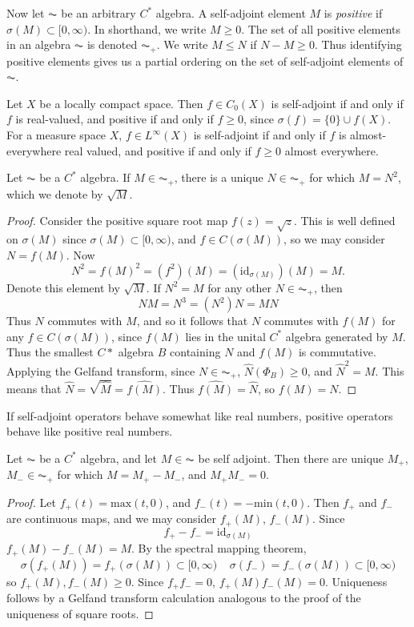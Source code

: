 Now let $\AC$ be an arbitrary $C^*$ algebra. A self-adjoint element $M$ is \emph{positive} if $\sigma(M) \subset [0, \infty)$. In shorthand, we write $M \geq 0$. The set of all positive elements in an algebra $\AC$ is denoted $\AC_+$. We write $M \leq N$ if $N - M \geq 0$. Thus identifying positive elements gives us a partial ordering on the set of self-adjoint elements of $\AC$.

\begin{example}
    Let $X$ be a locally compact space. Then $f \in C_0(X)$ is self-adjoint if and only if $f$ is real-valued, and positive if and only if $f \geq 0$, since $\sigma(f) = \{ 0 \} \cup f(X)$. For a measure space $X$, $f \in L^\infty(X)$ is self-adjoint if and only if $f$ is almost-everywhere real valued, and positive if and only if $f \geq 0$ almost everywhere.
\end{example}

\begin{prop}
    Let $\AC$ be a $C^*$ algebra. If $M \in \AC_+$, there is a unique $N \in \AC_+$ for which $M = N^2$, which we denote by $\sqrt{M}$.
\end{prop}
\begin{proof}
    Consider the positive square root map $f(z) = \sqrt{z}$. This is well defined on $\sigma(M)$ since $\sigma(M) \subset [0,\infty)$, and $f \in C(\sigma(M))$, so we may consider $N = f(M)$. Now
    \[ N^2 = f(M)^2 = (f^2)(M) = (\text{id}_{\sigma(M)})(M) = M. \]
    Denote this element by $\sqrt{M}$. If $N^2 = M$ for any other $N \in \AC_+$, then
    \[ NM = N^3 = (N^2)N = MN \]
    Thus $N$ commutes with $M$, and so it follows that $N$ commutes with $f(M)$ for any $f \in C(\sigma(M))$, since $f(M)$ lies in the unital $C^*$ algebra generated by $M$. Thus the smallest $C*$ algebra $B$ containing $N$ and $f(M)$ is commutative. Applying the Gelfand transform, since $N \in \AC_+$, $\widehat{N}(\Phi_B) \geq 0$, and $\widehat{N}^2 = M$. This means that $\widehat{N} = \sqrt{\widehat{M}} = \widehat{f(M)}$. Thus $\widehat{f(M)} = \widehat{N}$, so $f(M) = N$.
\end{proof}

If self-adjoint operators behave somewhat like real numbers, positive operators behave like positive real numbers.

\begin{prop}
    Let $\AC$ be a $C^*$ algebra, and let $M \in \AC$ be self adjoint. Then there are unique $M_+$, $M_- \in \AC_+$ for which $M = M_+ - M_-$, and $M_+ M_- = 0$.
\end{prop}
\begin{proof}
    Let $f_+(t) = \text{max}(t,0)$, and $f_-(t) = -\text{min}(t,0)$. Then $f_+$ and $f_-$ are continuous maps, and we may consider $f_+(M)$, $f_-(M)$. Since
    \[ f_+ - f_- = \text{id}_{\sigma(M)} \]
    $f_+(M) - f_-(M) = M$. By the spectral mapping theorem,
    \[ \sigma(f_+(M)) = f_+(\sigma(M)) \subset [0,\infty)\ \ \ \ \ \sigma(f_-) = f_-(\sigma(M)) \subset [0,\infty) \]
    so $f_+(M), f_-(M) \geq 0$. Since $f_+ f_- = 0$, $f_+(M) f_-(M) = 0$. Uniqueness follows by a Gelfand transform calculation analogous to the proof of the uniqueness of square roots.
\end{proof}

